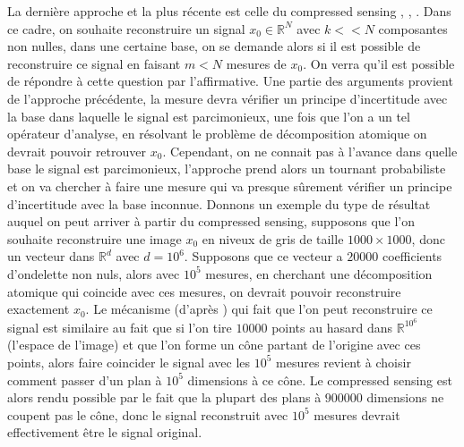 La dernière approche et la plus récente est celle du compressed sensing \cite{DonohoCS}, \cite{CandesTaoUniv}, \cite{CandesSparsityIncoherence}. 
Dans ce cadre, on souhaite reconstruire un signal $x_0 \in \mathbb{R}^N$ avec $k << N$ composantes non nulles, dans une certaine base, on se demande alors si il est possible de reconstruire ce signal en faisant $m<N$ mesures de $x_0$.
On verra qu'il est possible de répondre à cette question par l'affirmative.
Une partie des arguments provient de l'approche précédente, la mesure devra vérifier un principe d'incertitude avec la base dans laquelle le signal est parcimonieux, une fois que l'on a un tel opérateur d'analyse, en résolvant le problème de décomposition atomique on devrait pouvoir retrouver $x_0$.
Cependant, on ne connait pas à l'avance dans quelle base le signal est parcimonieux, l'approche prend alors un tournant probabiliste et on va chercher à faire une mesure qui va presque sûrement vérifier un principe d'incertitude avec la base inconnue.
\newline
Donnons un exemple du type de résultat auquel on peut arriver à partir du compressed sensing, supposons que l'on souhaite reconstruire une image $x_0$ en niveux de gris de taille $1000\times1000$, donc un vecteur dans $\mathbb{R}^d$ avec $d=10^6$. 
Supposons que ce vecteur a $20 000$ coefficients d'ondelette non nuls, alors avec $10^5$ mesures, en cherchant une décomposition atomique qui coincide avec ces mesures, on devrait pouvoir reconstruire exactement $x_0$.
Le mécanisme (d'après \cite{DonohoForMost}) qui fait que l'on peut reconstruire ce signal est similaire au fait que si l'on tire $10 000$ points au hasard dans $\mathbb{R}^{10^6}$ (l'espace de l'image) et que l'on forme un cône partant de l'origine avec ces points, alors faire coincider le signal avec les $10^5$ mesures revient à choisir comment passer d'un plan à $10^5$ dimensions à ce cône.
Le compressed sensing est alors rendu possible par le fait que la plupart des plans à $900 000$ dimensions ne coupent pas le cône, donc le signal reconstruit avec $10^5$ mesures devrait effectivement être le signal original.

